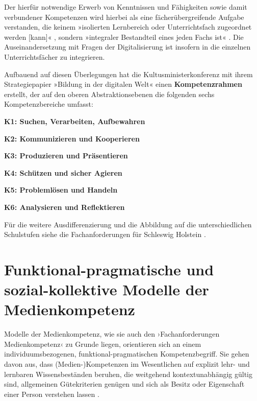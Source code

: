 \documentclass[
  a4paper,
]{book}
\begin{document}
Der hierfür notwendige Erwerb von Kenntnissen und Fähigkeiten sowie damit verbundener Kompetenzen wird hierbei als eine fächerübergreifende Aufgabe verstanden, die keinem »isolierten Lernbereich oder Unterrichtsfach zugeordnet werden {[}kann{]}« \citep[S. 10]{ministeriumfurbildungwissenschaftundkulturdeslandesschleswig-holsteinErganzungenFachanforderungenMedienkompetenz2018}, sondern »integraler Bestandteil eines jeden Fachs ist« \citep[S. 4]{ministeriumfurbildungwissenschaftundkulturdeslandesschleswig-holsteinErganzungenFachanforderungenMedienkompetenz2018}. Die Auseinandersetzung mit Fragen der Digitalisierung ist insofern in die einzelnen Unterrichtsfächer zu integrieren.

Aufbauend auf diesen Überlegungen hat die Kultusministerkonferenz mit ihrem Strategiepapier »Bildung in der digitalen Welt« einen \textbf{Kompetenzrahmen} erstellt, der auf den oberen Abstraktionsebenen die folgenden sechs Kompetenzbereiche umfasst:

{\textbf{K1: Suchen, Verarbeiten, Aufbewahren}}

{\textbf{K2: Kommunizieren und Kooperieren}}

{\textbf{K3: Produzieren und Präsentieren}}

{\textbf{K4: Schützen und sicher Agieren}}

{\textbf{K5: Problemlösen und Handeln}}

{\textbf{K6: Analysieren und Reflektieren}}

Für die weitere Ausdifferenzierung und die Abbildung auf die unterschiedlichen Schulstufen siehe die Fachanforderungen für Schleswig Holstein \citep{ministeriumfurbildungwissenschaftundkulturdeslandesschleswig-holsteinErganzungenFachanforderungenMedienkompetenz2018}.

\section{Funktional-pragmatische und sozial-kollektive Modelle der Medienkompetenz}\label{funktional-pragmatische-und-sozial-kollektive-modelle-der-medienkompetenz}

Modelle der Medienkompetenz, wie sie auch den ›Fachanforderungen Medienkompetenz‹ \citep{ministeriumfurbildungwissenschaftundkulturdeslandesschleswig-holsteinErganzungenFachanforderungenMedienkompetenz2018} zu Grunde liegen, orientieren sich an einem individuumsbezogenen, funktional-pragmatischen Kompetenzbegriff. Sie gehen davon aus, dass (Medien-)Kompetenzen im Wesentlichen auf explizit lehr- und lernbaren Wissensbeständen beruhen, die weitgehend kontextunabhängig gültig sind, allgemeinen Gütekriterien genügen und sich als Besitz oder Eigenschaft einer Person verstehen lassen \citep{alkemeyerBefahigenPraxistheoretischeUberlegungen2017, blohRekonstruktiveEvaluationsforschungIm2022}.
\end{document}

